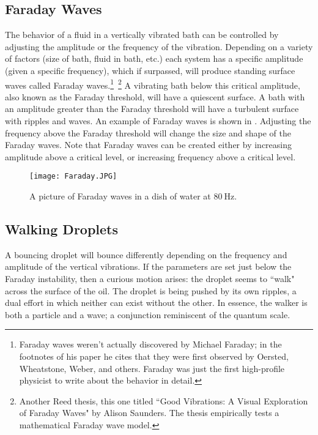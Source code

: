 \subsection*{Faraday Waves}
	    The behavior of a fluid in a vertically vibrated bath can be controlled by adjusting the amplitude or the frequency of the vibration. Depending on a variety of factors (size of bath, fluid in bath, etc.) each system has a specific amplitude (given a specific frequency), which if surpassed, will produce standing surface waves called Faraday waves.\footnote{Faraday waves weren't actually discovered by Michael Faraday; in the footnotes of his paper he cites that they were first observed by Oersted, Wheatstone, Weber, and others. Faraday was just the first high-profile physicist to write about the behavior in detail.}~\footnote{Another Reed thesis, this one titled ``Good Vibrations: A Visual Exploration of Faraday Waves" by Alison Saunders. The thesis empirically tests a mathematical Faraday wave model. } A vibrating bath below this critical amplitude, also known as the Faraday threshold, will have a quiescent surface. A bath with an amplitude greater than the Faraday threshold will have a turbulent surface with ripples and waves. An example of Faraday waves is shown in . Adjusting the frequency above the Faraday threshold will change the size and shape of the Faraday waves. Note that Faraday waves can be created either by increasing amplitude above a critical level, or increasing frequency above a critical level.
	    
	    \begin{figure}[h!]
	\centering
	\texttt{[image: Faraday.JPG]}
	\caption{A picture of Faraday waves in a dish of water at $80~\mathrm{Hz}$.}
	\label{faraday waves}
\end{figure}

\subsection*{Walking Droplets}
	    
	A bouncing droplet will bounce differently depending on the frequency and amplitude of the vertical vibrations. If the parameters are set just below the Faraday instability, then a curious motion arises: the droplet seems to ``walk" across the surface of the oil. The droplet is being pushed by its own ripples, a dual effort in which neither can exist without the other. In essence, the walker is both a particle and a wave; a conjunction reminiscent of the quantum scale. 
	  
